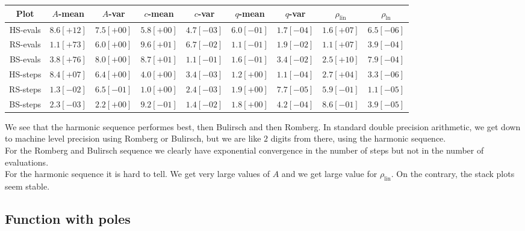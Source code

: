 \begin{table}[H]
    \centering
    \small
    \begin{tabular}{c||c|c|c|c|c|c|c|c}
Plot & \(A\)-mean & \(A\)-var & \(c\)-mean & \(c\)-var & \(q\)-mean & \(q\)-var & \(\rho_{\operatorname{lin}}\) & \(\rho_{\ln}\)\\\hline
\rowcolor{yellow}
HS-evals & \(8.6[+12]\) & \(7.5[+00]\) & \(5.8[+00]\) & \(4.7[-03]\) & \(6.0[-01]\) & \(1.7[-04]\) & \(1.6[+07]\) & \(6.5[-06]\) \\
\rowcolor{red}
RS-evals & \(1.1[+73]\) & \(6.0[+00]\) & \(9.6[+01]\) & \(6.7[-02]\) & \(1.1[-01]\) & \(1.9[-02]\) & \(1.1[+07]\) & \(3.9[-04]\) \\
\rowcolor{red}
BS-evals & \(3.8[+76]\) & \(8.0[+00]\) & \(8.7[+01]\) & \(1.1[-01]\) & \(1.6[-01]\) & \(3.4[-02]\) & \(2.5[+10]\) & \(7.9[-04]\) \\
\rowcolor{yellow}
HS-steps & \(8.4[+07]\) & \(6.4[+00]\) & \(4.0[+00]\) & \(3.4[-03]\) & \(1.2[+00]\) & \(1.1[-04]\) & \(2.7[+04]\) & \(3.3[-06]\) \\
\rowcolor{green}
RS-steps & \(1.3[-02]\) & \(6.5[-01]\) & \(1.0[+00]\) & \(2.4[-03]\) & \(1.9[+00]\) & \(7.7[-05]\) & \(5.9[-01]\) & \(1.1[-05]\) \\
\rowcolor{green}
BS-steps & \(2.3[-03]\) & \(2.2[+00]\) & \(9.2[-01]\) & \(1.4[-02]\) & \(1.8[+00]\) & \(4.2[-04]\) & \(8.6[-01]\) & \(3.9[-05]\) \\
    \end{tabular}
    \label{tab:my_label}
\end{table}

We see that the harmonic sequence performes best, then Bulirsch and then Romberg. In standard double precision arithmetic, we get down to machine level precision using Romberg or Bulirsch, but we are like \(2\) digits from there, using the harmonic sequence.\\

For the Romberg and Bulirsch sequence we clearly have exponential convergence in the number of steps but not in the number of evaluations.\\

For the harmonic sequence it is hard to tell. We get very large values of \(A\) and we get large value for \(\rho_{\operatorname{lin}}\). On the contrary, the stack plots seem stable.

\subsection{Function with poles}

